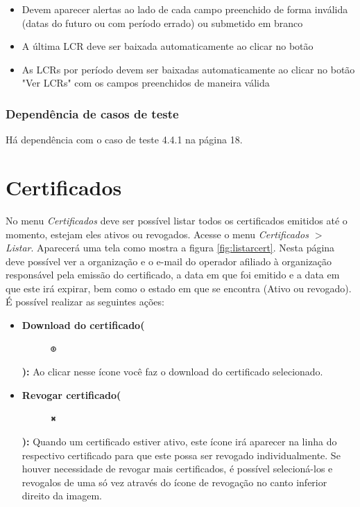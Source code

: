 \begin{itemize}

	\item Devem aparecer alertas ao lado de cada campo preenchido de forma inválida (datas do futuro ou com período errado) ou submetido em branco
    \item A última LCR deve ser baixada automaticamente ao clicar no botão
    \item As LCRs por período devem ser baixadas automaticamente ao clicar no botão "Ver LCRs" com os campos preenchidos de maneira válida
	
\end{itemize}

\subsubsection{Dependência de casos de teste}
Há dependência com o caso de teste 4.4.1 na página 18.

\section{Certificados}

No menu \textit{Certificados} deve ser possível listar todos os certificados emitidos até o momento, estejam eles ativos ou revogados. Acesse o menu \textit{Certificados $>$ Listar}. Aparecerá uma tela como mostra a figura \ref{fig:listarcert}. Nesta página deve possível ver a organização e o e-mail do operador afiliado à organização responsável pela emissão do certificado, a data em que foi emitido e a data em que este irá expirar, bem como o estado em que se encontra (Ativo ou revogado). É possível realizar as seguintes ações:

\begin{itemize}

	\item \textbf{Download do certificado(}\begin{figure} \includegraphics[height=10]{images/iconedownload} \end{figure} \textbf{):} Ao clicar nesse ícone você faz o download do certificado selecionado.
	\item \textbf{Revogar certificado(}\begin{figure} \includegraphics[height=10]{images/iconedelete2} \end{figure} \textbf{):} Quando um certificado estiver ativo, este ícone irá aparecer na linha do respectivo certificado para que este possa ser revogado individualmente. Se houver necessidade de revogar mais certificados, é possível selecioná-los e revogalos de uma só vez através do ícone de revogação no canto inferior direito da imagem. 
	
\end{itemize}

